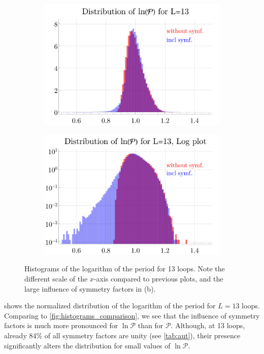 \documentclass[12pt,a4paper]{article}
\newcommand{\period}{\mathcal P}
\renewcommand{\|}{\rule[-0.4ex]{0.2ex}{1.2em}}
\begin{document}
\begin{figure}[htbp]
	\centering
	\begin{subfigure}[b]{.48 \textwidth}
		\includegraphics[width=\linewidth]{distribution_P_13_log}
		\subcaption{}
	\end{subfigure}
	\begin{subfigure}[b]{.48 \textwidth}
		\includegraphics[width=\linewidth]{distribution_P_13_log_log}
		\subcaption{}
	\end{subfigure}
	
	\caption{Histograms of the logarithm of the period for 13 loops. Note the different scale of the $x$-axis compared to previous plots, and the large influence of symmetry factors in (b). }
	\label{fig:histograms_logP}
\end{figure}


 shows the normalized distribution of the logarithm of the period for $L=13$ loops. Comparing to   \cref{fig:histograms_comparison}, we see that the influence of symmetry factors is much more pronounced for $\ln \period$ than for $\period$.  Although, at 13 loops, already 84\% of all symmetry factors are unity (see \cref{tab:aut}), their presence significantly alters the distribution for small values of $\ln \period $. 
\end{document}
